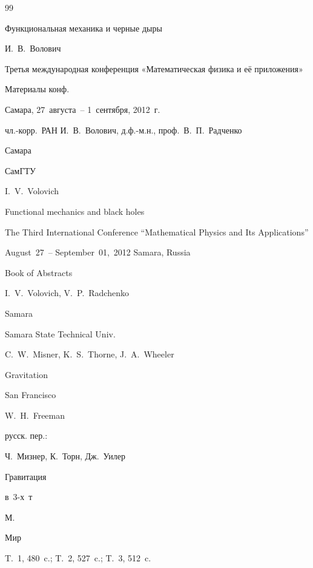 \begin{thebibliography}{99}

\paper Функциональная механика и черные дыры

\by И.~В.~Волович

\inbook Третья международная конференция «Математическая физика и её приложения»

\bookinfo Материалы конф.

\procinfo Самара, 27~августа~– 1~сентября, 2012~г.

\eds чл.-корр.~РАН И.~В.~Волович, д.ф.-м.н., проф.~В.~П.~Радченко

\publaddr Самара

\publ СамГТУ



\misctransl

\by I.~V.~Volovich

\paper Functional mechanics and black holes

\inbook The Third International Conference ``Mathematical Physics and Its Applications''

\procinfo August~27~– September~01,~2012 Samara, Russia

\bookinfo Book of Abstracts

\eds I.~V.~Volovich, V.~P.~Radchenko

\publaddr Samara

\publ Samara State Technical Univ.










\by  C.~W.~Misner, K.~S.~Thorne, J.~A.~Wheeler 


\book Gravitation

\publaddr San Francisco

\publ W.~H.~Freeman


\rtransl русск. пер.:~

\by Ч.~Мизнер,  К.~Торн,  Дж.~Уилер

\book Гравитация 

\bookinfo в~3-х~т%

\publaddr М.

\publ Мир


\miscnote T.~1, 480~c.; T.~2, 527~c.; T.~3, 512~c.






\end{thebibliography}

